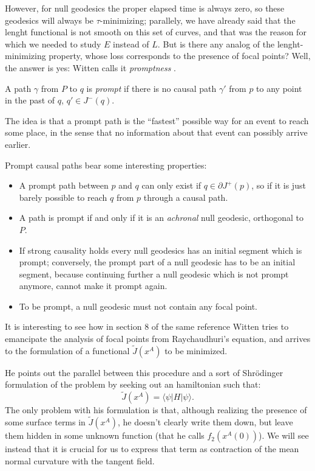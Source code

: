 However, for null geodesics the proper elapsed time is always zero, so these geodesics will always be \(\tau\)-minimizing; parallely, we have already said that the lenght functional is not smooth on this set of curves, and that was the reason for which we needed to study \(E\) instead of \(L\). But is there any analog of the lenght-minimizing property, whose loss corresponds to the presence of focal points? Well, the answer is yes: Witten calls it \emph{promptness} \cite{witten2020light}.

\begin{definition}
	A path \(\gamma\) from \(P\) to \(q\) is \emph{prompt} if there is no causal path \(\gamma'\) from \(p\) to any point in the past of \(q\), \(q'\in J^-(q)\).
\end{definition}

The idea is that a prompt path is the ``fastest'' possible way for an event to reach some place, in the sense that no information about that event can possibly arrive earlier.

Prompt causal paths bear some interesting properties:
\begin{itemize}
	\item[\ding{99}] A prompt path between \(p\) and \(q\) can only exist if \(q\in\partial J^+(p)\), so if it is just barely possible to reach \(q\) from \(p\) through a causal path.
	\item[\ding{99}] A path is prompt if and only if it is an \emph{achronal} null geodesic, orthogonal to \(P\).
	\item[\ding{99}] If strong causality holds every null geodesics has an initial segment which is prompt; conversely, the prompt part of a null geodesic has to be an initial segment, because continuing further a null geodesic which is not prompt anymore, cannot make it prompt again.
	\item[\ding{99}] To be prompt, a null geodesic must not contain any focal point.
\end{itemize}

It is interesting to see how in section \(8\) of the same reference Witten tries to emancipate the analysis of focal points from Raychaudhuri's equation, and arrives to the formulation of a functional \(\tilde{J}(x^A)\) to be minimized.

He points out the parallel between this procedure and a sort of Shr\"odinger formulation of the problem by seeking out an hamiltonian such that:
\[
	\tilde{J}(x^A) = \langle \psi \vert H \vert \psi \rangle.	
\]
The only problem with his formulation is that, although realizing the presence of some surface terms in \(\tilde{J}(x^A)\), he doesn't clearly write them down, but leave them hidden in some unknown function (that he calls \(f_2(x^A(0))\)). We will see instead that it is crucial for us to express that term as contraction of the mean normal curvature with the tangent field.
